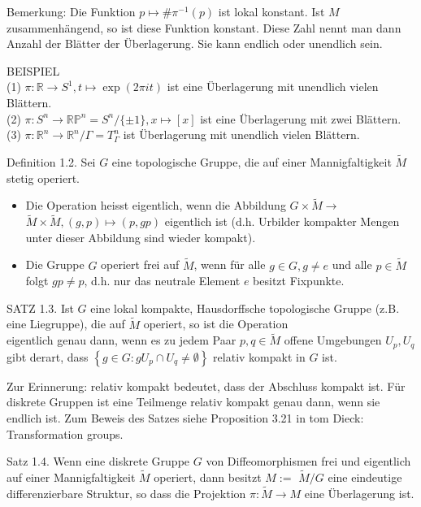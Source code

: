 \documentclass[10pt]{article}
\begin{document}
Bemerkung: Die Funktion $p \mapsto \# \pi^{-1}(p)$ ist lokal konstant. Ist $M$ zusammenhängend, so ist diese Funktion konstant. Diese Zahl nennt man dann Anzahl der Blätter der Überlagerung. Sie kann endlich oder unendlich sein.

BEISPIEL\\
(1) $\pi: \mathbb{R} \rightarrow S^{1}, t \mapsto \exp (2 \pi i t)$ ist eine Überlagerung mit unendlich vielen Blättern.\\
(2) $\pi: S^{n} \rightarrow \mathbb{R} \mathbb{P}^{n}=S^{n} /\{ \pm 1\}, x \mapsto[x]$ ist eine Überlagerung mit zwei Blättern.\\
(3) $\pi: \mathbb{R}^{n} \rightarrow \mathbb{R}^{n} / \Gamma=T_{\Gamma}^{n}$ ist Überlagerung mit unendlich vielen Blättern.

Definition 1.2. Sei $G$ eine topologische Gruppe, die auf einer Mannigfaltigkeit $\tilde{M}$ stetig operiert.

\begin{itemize}
  \item Die Operation heisst eigentlich, wenn die Abbildung $G \times \tilde{M} \rightarrow$ $\tilde{M} \times \tilde{M},(g, p) \mapsto(p, g p)$ eigentlich ist (d.h. Urbilder kompakter Mengen unter dieser Abbildung sind wieder kompakt).
  \item Die Gruppe $G$ operiert frei auf $\tilde{M}$, wenn für alle $g \in G, g \neq e$ und alle $p \in \tilde{M}$ folgt $g p \neq p$, d.h. nur das neutrale Element $e$ besitzt Fixpunkte.
\end{itemize}

SATZ 1.3. Ist $G$ eine lokal kompakte, Hausdorffsche topologische Gruppe (z.B. eine Liegruppe), die auf $\tilde{M}$ operiert, so ist die Operation\\
eigentlich genau dann, wenn es zu jedem Paar $p, q \in \tilde{M}$ offene Umgebungen $U_{p}, U_{q}$ gibt derart, dass $\left\{g \in G: g U_{p} \cap U_{q} \neq \emptyset\right\}$ relativ kompakt in $G$ ist.

Zur Erinnerung: relativ kompakt bedeutet, dass der Abschluss kompakt ist. Für diskrete Gruppen ist eine Teilmenge relativ kompakt genau dann, wenn sie endlich ist. Zum Beweis des Satzes siehe Proposition 3.21 in tom Dieck: Transformation groups.

Satz 1.4. Wenn eine diskrete Gruppe $G$ von Diffeomorphismen frei und eigentlich auf einer Mannigfaltigkeit $\tilde{M}$ operiert, dann besitzt $M:=$ $\tilde{M} / G$ eine eindeutige differenzierbare Struktur, so dass die Projektion $\pi: \tilde{M} \rightarrow M$ eine Überlagerung ist.
\end{document}
